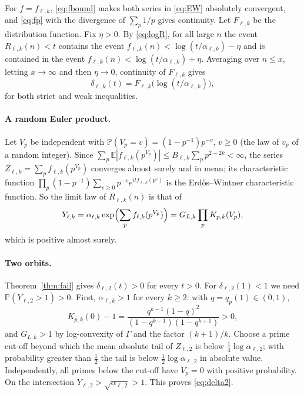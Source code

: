 \documentclass[11pt,a4paper]{article}
\theoremstyle{remark}
\numberwithin{equation}{section}
\begin{document}
For $f=f_{\ell,k}$, \eqref{eq:fbound} makes both series in \eqref{eq:EW} absolutely convergent, and \eqref{eq:fp} with the divergence of $\sum_p1/p$ gives continuity. Let $F_{\ell,k}$ be the distribution function. Fix $\eta>0$. By \eqref{eq:logR}, for all large $n$ the event $R_{\ell,k}(n)<t$ contains the event $f_{\ell,k}(n)<\log(t/\alpha_{\ell,k})-\eta$ and is contained in the event $f_{\ell,k}(n)<\log(t/\alpha_{\ell,k})+\eta$. Averaging over $n\le x$, letting $x\to\infty$ and then $\eta\to0$, continuity of $F_{\ell,k}$ gives
\begin{equation}\label{eq:deltaF}
\delta_{\ell,k}(t)=F_{\ell,k}\bigl(\log(t/\alpha_{\ell,k})\bigr),
\end{equation}
for both strict and weak inequalities.

\paragraph{A random Euler product.} Let $V_p$ be independent with $\mathbb P(V_p=v)=(1-p^{-1})p^{-v}$, $v\ge0$ (the law of $v_p$ of a random integer). Since $\sum_p\mathbb E|f_{\ell,k}(p^{V_p})|\le B_{\ell,k}\sum_pp^{2-2k}<\infty$, the series $Z_{\ell,k}=\sum_pf_{\ell,k}(p^{V_p})$ converges almost surely and in mean; its characteristic function $\prod_p(1-p^{-1})\sum_{v\ge0}p^{-v}e^{itf_{\ell,k}(p^v)}$ is the Erd\H{o}s--Wintner characteristic function. So the limit law of $R_{\ell,k}(n)$ is that of
\begin{equation}\label{eq:Y}
Y_{\ell,k}=\alpha_{\ell,k}\exp\Bigl(\sum_pf_{\ell,k}(p^{V_p})\Bigr)=G_{L,k}\prod_pK_{p,k}(V_p),
\end{equation}
which is positive almost surely.

\paragraph{Two orbits.} Theorem~\ref{thm:fail} gives $\delta_{\ell,2}(t)>0$ for every $t>0$. For $\delta_{\ell,2}(1)<1$ we need $\mathbb P(Y_{\ell,2}>1)>0$. First, $\alpha_{\ell,k}>1$ for every $k\ge2$: with $q=q_p(1)\in(0,1)$,
\begin{equation}\label{eq:K0}
K_{p,k}(0)-1=\frac{q^{k-1}(1-q)^2}{(1-q^{k-1})(1-q^{k+1})}>0,
\end{equation}
and $G_{L,k}>1$ by log-convexity of $\Gamma$ and the factor $(k+1)/k$. Choose a prime cut-off beyond which the mean absolute tail of $Z_{\ell,2}$ is below $\frac14\log\alpha_{\ell,2}$; with probability greater than $\frac12$ the tail is below $\frac12\log\alpha_{\ell,2}$ in absolute value. Independently, all primes below the cut-off have $V_p=0$ with positive probability. On the intersection $Y_{\ell,2}>\sqrt{\alpha_{\ell,2}}>1$. This proves \eqref{eq:delta2}.
\end{document}
